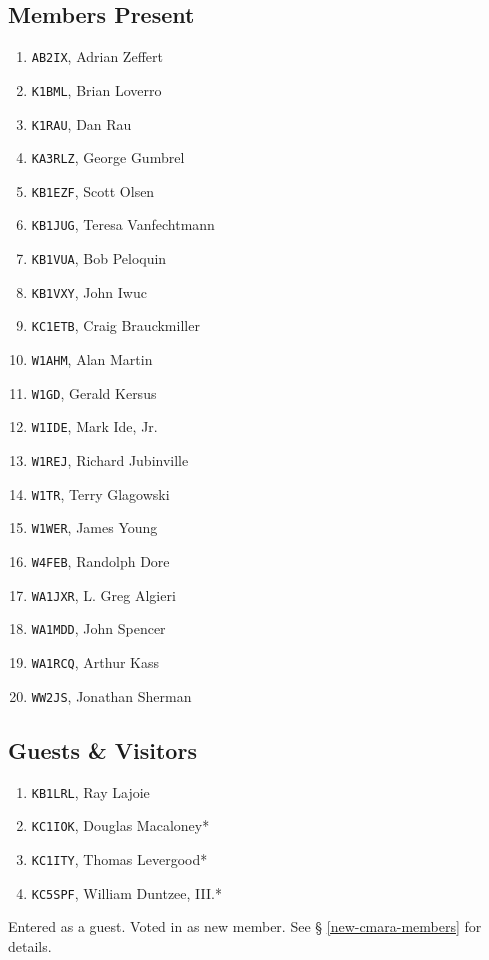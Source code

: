 \documentclass[10pt,letterpaper]{article}
\begin{document}
\subsection{Members Present}
\begin{enumerate}
\item \texttt{AB2IX}, Adrian Zeffert
\item \texttt{K1BML}, Brian Loverro
\item \texttt{K1RAU}, Dan Rau
\item \texttt{KA3RLZ}, George Gumbrel
\item \texttt{KB1EZF}, Scott Olsen
\item \texttt{KB1JUG}, Teresa Vanfechtmann
\item \texttt{KB1VUA}, Bob Peloquin
\item \texttt{KB1VXY}, John Iwuc
\item \texttt{KC1ETB}, Craig Brauckmiller
\item \texttt{W1AHM}, Alan Martin
\item \texttt{W1GD}, Gerald Kersus
\item \texttt{W1IDE}, Mark Ide, Jr.
\item \texttt{W1REJ}, Richard Jubinville
\item \texttt{W1TR}, Terry Glagowski
\item \texttt{W1WER}, James Young
\item \texttt{W4FEB}, Randolph Dore
\item \texttt{WA1JXR}, L. Greg Algieri
\item \texttt{WA1MDD}, John Spencer
\item \texttt{WA1RCQ}, Arthur Kass
\item \texttt{WW2JS}, Jonathan Sherman
\end{enumerate}

\subsection{Guests \& Visitors}
\begin{enumerate}
\item \texttt{KB1LRL}, Ray Lajoie
\item \texttt{KC1IOK}, Douglas Macaloney*
\item \texttt{KC1ITY}, Thomas Levergood*
\item \texttt{KC5SPF}, William Duntzee, III.*
\end{enumerate}

\noindent
\textasteriskcentered{} Entered as a guest. Voted in as new member. See \S{} \ref{new-cmara-members} for details.
\end{document}
